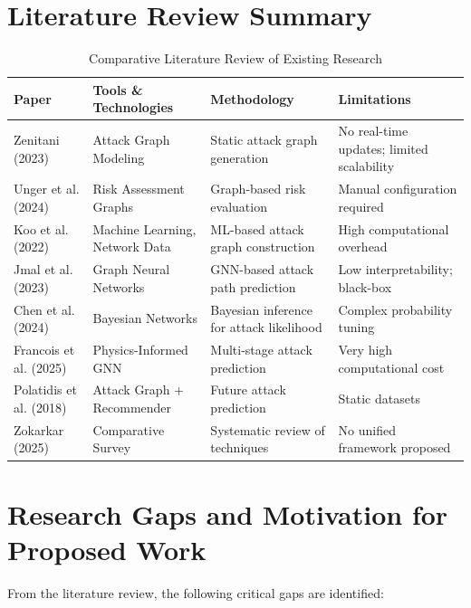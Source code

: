\documentclass[12pt, a4paper]{report}
\begin{document}
\section{Literature Review Summary}

\begin{table}[H]
\centering
\caption{Comparative Literature Review of Existing Research}
\label{tab:lit_review}
\small
\begin{tabularx}{\textwidth}{>{\raggedright}p{2.2cm} >{\raggedright}p{3cm} >{\raggedright}p{4cm} X}
\toprule
\textbf{Paper} & \textbf{Tools \& Technologies} & \textbf{Methodology} & \textbf{Limitations} \\
\midrule
Zenitani (2023) \cite{zenitani2023} & Attack Graph Modeling & Static attack graph generation & No real-time updates; limited scalability \\
\addlinespace
Unger et al. (2024) \cite{unger2024} & Risk Assessment Graphs & Graph-based risk evaluation & Manual configuration required \\
\addlinespace
Koo et al. (2022) \cite{koo2022} & Machine Learning, Network Data & ML-based attack graph construction & High computational overhead \\
\addlinespace
Jmal et al. (2023) \cite{jmal2023} & Graph Neural Networks & GNN-based attack path prediction & Low interpretability; black-box \\
\addlinespace
Chen et al. (2024) \cite{chen2024} & Bayesian Networks & Bayesian inference for attack likelihood & Complex probability tuning \\
\addlinespace
Francois et al. (2025) \cite{francois2025} & Physics-Informed GNN & Multi-stage attack prediction & Very high computational cost \\
\addlinespace
Polatidis et al. (2018) \cite{polatidis2018} & Attack Graph + Recommender & Future attack prediction & Static datasets \\
\addlinespace
Zokarkar (2025) \cite{zokarkar2025} & Comparative Survey & Systematic review of techniques & No unified framework proposed \\
\bottomrule
\end{tabularx}
\end{table}

\section{Research Gaps and Motivation for Proposed Work}

From the literature review, the following critical gaps are identified:
\end{document}
